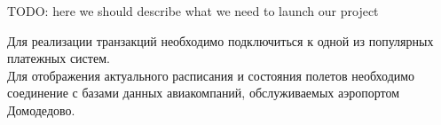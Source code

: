 TODO: here we should describe what we need to launch our project

Для реализации транзакций необходимо подключиться к одной из популярных платежных систем.\\
Для отображения актуального расписания и состояния полетов необходимо соединение с базами данных авиакомпаний, 
обслуживаемых аэропортом Домодедово.